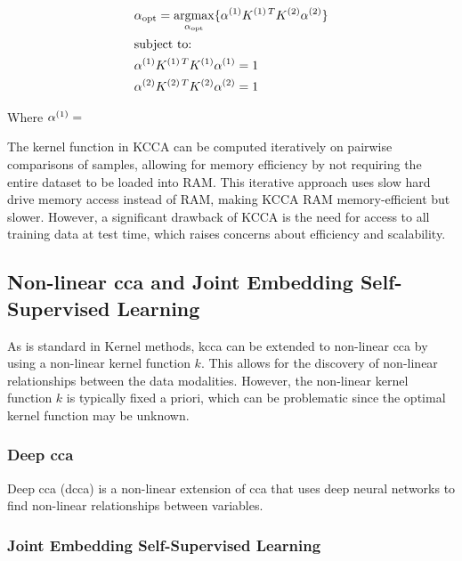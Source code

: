 \begin{align}
    & \alpha_{\text{opt}}=\underset{\alpha_{\text{opt}}}{\mathrm{argmax}}\{ \alpha^{(1)}K^{(1)\,T}K^{(2)}\alpha^{(2)}  \} \\
    & \text{subject to:} \notag                                                                                            \\
    & \alpha^{(1)}K^{(1)\,T}K^{(1)}\alpha^{(1)}=1 \notag                                                                  \\
    & \alpha^{(2)}K^{(2)\,T}K^{(2)}\alpha^{(2)}=1 \notag
\end{align}

Where \(\alpha^{(1)}=\)

The kernel function in KCCA can be computed iteratively on pairwise comparisons of samples, allowing for memory efficiency by not requiring the entire dataset to be loaded into RAM.
This iterative approach uses slow hard drive memory access instead of RAM, making KCCA RAM memory-efficient but slower.
However, a significant drawback of KCCA is the need for access to all training data at test time, which raises concerns about efficiency and scalability.

\subsection{Non-linear \acrshort{cca} and Joint Embedding Self-Supervised Learning}

As is standard in Kernel methods, \acrshort{kcca} can be extended to non-linear \acrshort{cca} by using a non-linear kernel function \(k\).
This allows for the discovery of non-linear relationships between the data modalities.
However, the non-linear kernel function \(k\) is typically fixed a priori, which can be problematic since the optimal kernel function may be unknown.

\subsubsection{Deep \acrshort{cca}}

Deep \acrshort{cca} (\acrshort{dcca}) is a non-linear extension of \acrshort{cca} that uses deep neural networks to find non-linear relationships between variables.

\subsubsection{Joint Embedding Self-Supervised Learning}

